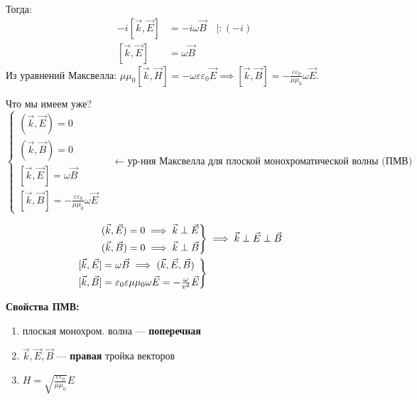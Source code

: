 Тогда: 
\begin{align*}
	-i[\vec{k}, \vec{E}] &= -i\omega\vec{B} \quad \Big| :(-i) \\
	[\vec{k}, \vec{E}] &= \omega\vec{B}
\end{align*}
Из уравнений Максвелла: 
$\mu\mu_0[\vec{k}, \vec{H}] = -\omega\varepsilon\varepsilon_0\vec{E} \implies [\vec{k}, \vec{B}] = -\frac{\varepsilon\varepsilon_0}{\mu\mu_0}\omega\vec{E}$.

Что мы имеем уже?
\begin{equation}
	\begin{cases}
		(\vec{k}, \vec{E}) = 0 \\
		(\vec{k}, \vec{B}) = 0 \\
		[\vec{k}, \vec{E}] = \omega\vec{B} \\
		[\vec{k}, \vec{B}] = -\frac{\varepsilon\varepsilon_0}{\mu\mu_0}\omega\vec{E}
	\end{cases} \quad \leftarrow \text{ур-ния Максвелла для плоской монохроматической волны (ПМВ)}
\end{equation}

\begin{align*}
	\begin{rcases} (\vec{k}, \vec{E}) = 0 \implies \vec{k} \perp \vec{E} \\ (\vec{k}, \vec{B}) = 0 \implies \vec{k} \perp \vec{B} \end{rcases} &\implies \vec{k} \perp \vec{E} \perp \vec{B} \\
	\begin{rcases} [\vec{k}, \vec{E}] = \omega\vec{B} \implies (\vec{k}, \vec{E}, \vec{B}) \\ [\vec{k}, \vec{B}] = \varepsilon_0\varepsilon\mu\mu_0\omega\vec{E} = -\frac{\omega}{v^2}\vec{E} \end{rcases}
\end{align*}

\begin{nb}
	\textbf{Свойства ПМВ:}
	\begin{enumerate}
		\item плоская монохром. волна --- \textbf{поперечная}
		\item $\vec{k}, \vec{E}, \vec{B}$ --- \textbf{правая} тройка векторов
		\item $H = \sqrt{\frac{\varepsilon\varepsilon_0}{\mu\mu_0}} E$
	\end{enumerate}
\end{nb}

